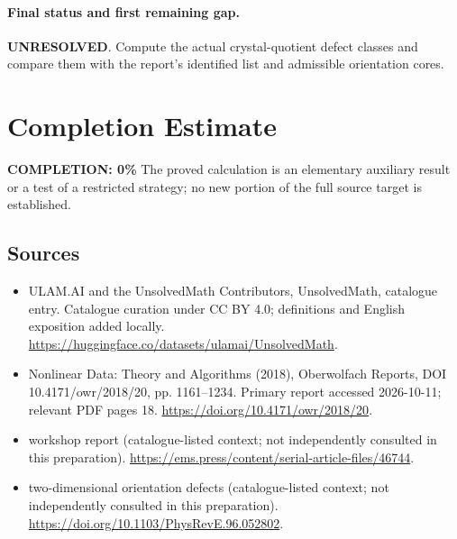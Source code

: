 \documentclass[11pt]{article}
\begin{document}
\paragraph{Final status and first remaining gap.}
\textbf{UNRESOLVED}. Compute the actual crystal-quotient defect classes and compare them with the report’s identified list and admissible orientation cores.

\section{Completion Estimate}
\noindent\textbf{COMPLETION: 0\%}
The proved calculation is an elementary auxiliary result or a test of a restricted strategy; no new portion of the full source target is established.

\subsection{Sources}
\begin{itemize}
\item[\hypertarget{source:statement:1}{S1}] ULAM.AI and the UnsolvedMath Contributors, UnsolvedMath, catalogue entry. Catalogue curation under CC BY 4.0; definitions and English exposition added locally.
\url{https://huggingface.co/datasets/ulamai/UnsolvedMath}.
\item[\hypertarget{source:statement:2}{S2}] Nonlinear Data: Theory and Algorithms (2018), Oberwolfach Reports, DOI 10.4171/owr/2018/20, pp. 1161--1234. Primary report accessed 2026-10-11; relevant PDF pages 18.
\url{https://doi.org/10.4171/owr/2018/20}.
\item[\hypertarget{source:statement:3}{S3}] workshop report (catalogue-listed context; not independently consulted in this preparation).
\url{https://ems.press/content/serial-article-files/46744}.
\item[\hypertarget{source:statement:4}{S4}] two-dimensional orientation defects (catalogue-listed context; not independently consulted in this preparation).
\url{https://doi.org/10.1103/PhysRevE.96.052802}.
\end{itemize}
\label{end:statement}
\end{document}
